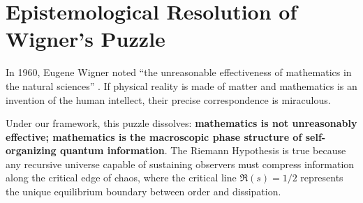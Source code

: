 \documentclass[11pt,a4paper]{article}
\begin{document}
\section{Epistemological Resolution of Wigner's Puzzle}
In 1960, Eugene Wigner noted ``the unreasonable effectiveness of mathematics in the natural sciences'' \cite{wigner1960unreasonable}. If physical reality is made of matter and mathematics is an invention of the human intellect, their precise correspondence is miraculous.

Under our framework, this puzzle dissolves: \textbf{mathematics is not unreasonably effective; mathematics is the macroscopic phase structure of self-organizing quantum information}. The Riemann Hypothesis is true because any recursive universe capable of sustaining observers must compress information along the critical edge of chaos, where the critical line $\Re(s) = 1/2$ represents the unique equilibrium boundary between order and dissipation.



\end{document}
